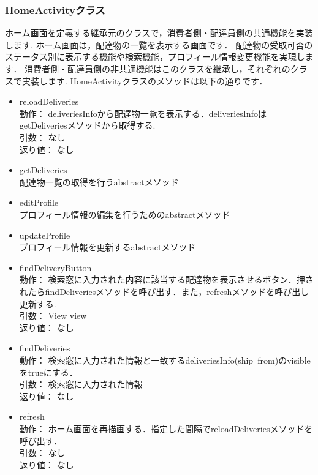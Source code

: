 \documentclass[a4j,titlepage]{jarticle}
\begin{document}
\subsubsection{HomeActivityクラス}
ホーム画面を定義する継承元のクラスで，消費者側・配達員側の共通機能を実装します.
ホーム画面は，配達物の一覧を表示する画面です．
配達物の受取可否のステータス別に表示する機能や検索機能，プロフィール情報変更機能を実現します．
消費者側・配達員側の非共通機能はこのクラスを継承し，それぞれのクラスで実装します.
HomeActivityクラスのメソッドは以下の通りです．
\begin{itemize}
\item reloadDeliveries\\
動作： deliveriesInfoから配達物一覧を表示する．deliveriesInfoはgetDeliveriesメソッドから取得する.\\
引数： なし\\
返り値： なし

\item getDeliveries\\
  配達物一覧の取得を行うabstractメソッド\\

\item editProfile\\
  プロフィール情報の編集を行うためのabstractメソッド\\

\item updateProfile\\
  プロフィール情報を更新するabstractメソッド\\

\item findDeliveryButton\\
動作： 検索窓に入力された内容に該当する配達物を表示させるボタン．押されたらfindDeliveriesメソッドを呼び出す．また，refreshメソッドを呼び出し更新する.\\
引数： View view\\
返り値： なし

\item findDeliveries\\
動作： 検索窓に入力された情報と一致するdeliveriesInfo(ship\verb|_|from)のvisibleをtrueにする．\\
引数： 検索窓に入力された情報\\
返り値： なし
　
\item refresh\\
動作： ホーム画面を再描画する．指定した間隔でreloadDeliveriesメソッドを呼び出す．\\
引数： なし\\
返り値： なし


\end{itemize}
\end{document}
